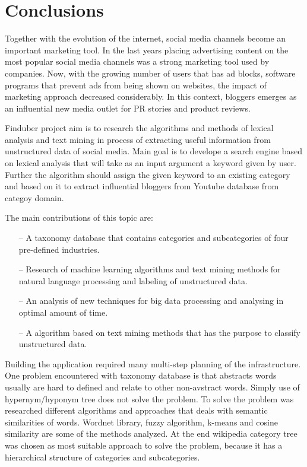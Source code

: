 \section*{Conclusions}

\setcounter{page}{61}

Together with the evolution of the internet, social media channels become an important marketing tool. In the last years placing advertising content on the most popular social media channels was a strong marketing tool used by companies. Now, with the growing number of users that has ad blocks, software programs that prevent ads from being shown on websites, the impact of marketing approach decreased considerably. In this context, bloggers emerges as an influential new media outlet for PR stories and product reviews.

Finduber project aim is to research the algorithms and methods of lexical analysis and text mining in process of extracting useful information from unstructured data of social media. Main goal is to develope a search engine based on lexical analysis that will take as an input argument a keyword given by user. Further the algorithm should assign the given keyword to an existing category and based on it to extract influential bloggers from Youtube database from categoy domain.

The main contributions of this topic are:

\begin{itemize}
\item[--] A taxonomy database that contains categories and subcategories of four pre-defined industries. 

\item[--] Research of machine learning algorithms and text mining methods for natural language processing and labeling of unstructured data.

\item[--] An analysis of new techniques for big data processing and analysing in optimal amount of time. 

\item[--] A algorithm based on text mining methods that has the purpose to classify unstructured data.
\end{itemize}

Building the application required many multi-step planning of the infrastructure. One problem encountered with taxonomy database is that abstracts words usually are hard to defined and relate to other non-avstract words. Simply use of hypernym/hyponym tree does not solve the problem. To solve the problem was researched different algorithms and approaches that deals with semantic similarities of words. Wordnet library, fuzzy algorithm, k-means and cosine similarity are some of the methods analyzed. At the end wikipedia category tree was chosen as most suitable approach to solve the problem, because it has a hierarchical structure of categories and subcategories.

